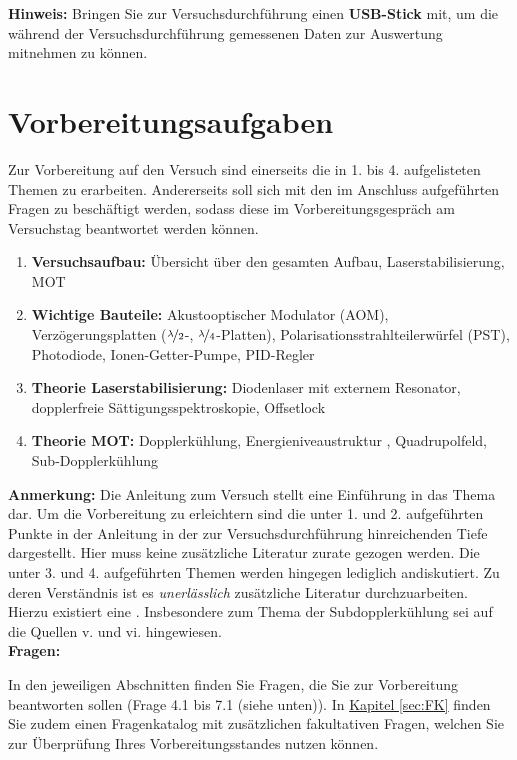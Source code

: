 \documentclass[
class=book,
accentcolor=1b,
custommargins=geometry,
fontsize=11pt,
thesis={type=Versuchsanleitung},
ruledheaders=all,
headline=false,
instbox=false,
marginpar=false,
title=small,
ignore-missing-data=true,
twoside=false,
logofile=apqdesign/tuda_logo.pdf,
pdfa=false %
]{apqpub}
\renewcommand{\emph}[1]{\textcolor{TUDa-1b}{\textbf{#1}}}
\begin{document}
\textbf{Hinweis:} Bringen Sie zur Versuchsdurchführung einen \emph{USB-Stick} mit, um die während der Versuchsdurchführung gemessenen Daten zur Auswertung mitnehmen zu können.

\section{Vorbereitungsaufgaben}

Zur Vorbereitung auf den Versuch sind einerseits die in 1. bis 4. aufgelisteten Themen zu erarbeiten. 
Andererseits soll sich mit den im Anschluss aufgeführten Fragen zu beschäftigt werden, sodass diese im Vorbereitungsgespräch am Versuchstag beantwortet werden können. 
\begin{enumerate}
	\item \textbf{Versuchsaufbau:} Übersicht über den gesamten Aufbau, Laserstabilisierung, MOT
	\item \textbf{Wichtige Bauteile:} Akustooptischer Modulator (AOM), Verzögerungsplatten ($\nicefrac{\lambda}{2}$-, $\nicefrac{\lambda}{4}$-Platten), Polarisationsstrahlteilerwürfel (PST), Photodiode, Ionen-Getter-Pumpe, PID-Regler
	\item \textbf{Theorie Laserstabilisierung:} Diodenlaser mit externem Resonator, dopplerfreie Sättigungsspektroskopie, Offsetlock
	\item \sloppy \textbf{Theorie MOT:} Dopplerkühlung, Energieniveaustruktur , Quadrupolfeld, Sub-Dopplerkühlung   
\end{enumerate}
\textbf{Anmerkung:} Die Anleitung zum Versuch stellt eine Einführung in das Thema dar. Um die Vorbereitung zu erleichtern sind die unter 1. und 2. aufgeführten Punkte in der Anleitung in der zur Versuchsdurchführung hinreichenden Tiefe dargestellt. Hier muss keine zusätzliche Literatur zurate gezogen werden. 
Die unter 3. und 4. aufgeführten Themen werden hingegen lediglich andiskutiert.
Zu deren Verständnis ist es \textit{unerlässlich} zusätzliche Literatur durchzuarbeiten. 
Hierzu existiert eine . 
Insbesondere zum Thema der Subdopplerkühlung sei auf die Quellen v. und vi. hingewiesen.\\

\textbf{Fragen:}  

In den jeweiligen Abschnitten finden Sie Fragen, die Sie zur Vorbereitung beantworten sollen (Frage 4.1 bis 7.1 (siehe unten)). In \hyperref[sec:FK]{Kapitel \ref{sec:FK}} finden Sie zudem einen Fragenkatalog mit zusätzlichen fakultativen Fragen, welchen Sie zur Überprüfung Ihres Vorbereitungsstandes nutzen können.
\end{document}
